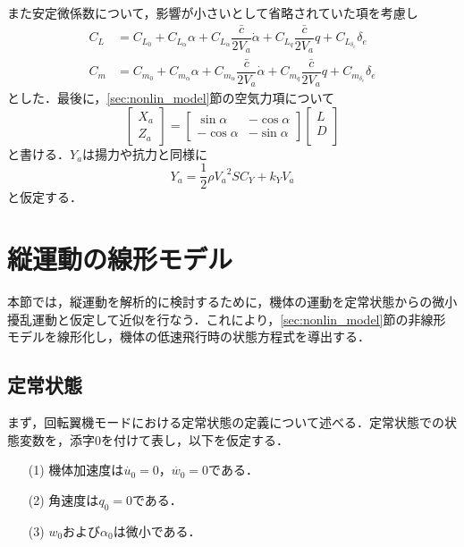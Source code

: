 また安定微係数について，影響が小さいとして省略されていた項を考慮し
\begin{align}
  C_L &= C_{L_0}+C_{L_\alpha}\alpha+C_{L_{\dot{\alpha}}}\dfrac{\bar{c}}{2V_a}\dot{\alpha}+C_{L_q}\dfrac{\bar{c}}{2V_a}q+C_{L_{\delta_e}}\delta_e \\
  C_m &= C_{m_0}+C_{m_\alpha}\alpha+C_{m_{\dot{\alpha}}}\dfrac{\bar{c}}{2V_a}\dot{\alpha}+C_{m_q}\dfrac{\bar{c}}{2V_a}q+C_{m_{\delta_e}}\delta_e
\end{align}
とした．最後に，\ref{sec:nonlin_model}節の空気力項について
\begin{equation}
  \left[
  \begin{array}{ccc}
    X_a \\
    Z_a
  \end{array}
  \right] =
  \left[
  \begin{array}{ccc}
    \sin\alpha & -\cos\alpha \\
    -\cos\alpha & -\sin\alpha
  \end{array}
  \right]
  \left[
  \begin{array}{ccc}
    L \\
    D \\
  \end{array}
  \right]
\end{equation}
と書ける．$Y_a$は揚力や抗力と同様に
\begin{equation}
  Y_a = \dfrac{1}{2}\rho {V_a}^2 S C_Y + k_Y V_a
\end{equation}
と仮定する．

\section{縦運動の線形モデル}
本節では，縦運動を解析的に検討するために，機体の運動を定常状態からの微小擾乱運動と仮定して近似を行なう．これにより，\ref{sec:nonlin_model}節の非線形モデルを線形化し，機体の低速飛行時の状態方程式を導出する．

\subsection{定常状態}

まず，回転翼機モードにおける定常状態の定義について述べる．定常状態での状態変数を，添字0を付けて表し，以下を仮定する．
	\begin{itemize}
	\item[(1)]機体加速度は$\dot{u_0} = 0$，$\dot{w_0} = 0$である．
	\item[(2)]角速度は$q_0 = 0$である．
  \item[(3)]$w_0$および$\alpha_0$は微小である．
	\end{itemize}

